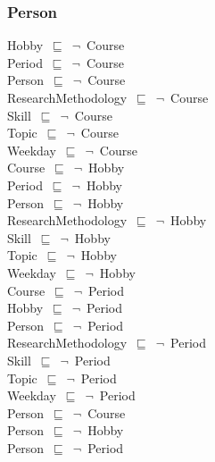 \documentclass{article}
\begin{document}
\subsubsection*{Person}

Hobby~\ensuremath{\sqsubseteq}~\ensuremath{\lnot}~Course\\
Period~\ensuremath{\sqsubseteq}~\ensuremath{\lnot}~Course\\
Person~\ensuremath{\sqsubseteq}~\ensuremath{\lnot}~Course\\
ResearchMethodology~\ensuremath{\sqsubseteq}~\ensuremath{\lnot}~Course\\
Skill~\ensuremath{\sqsubseteq}~\ensuremath{\lnot}~Course\\
Topic~\ensuremath{\sqsubseteq}~\ensuremath{\lnot}~Course\\
Weekday~\ensuremath{\sqsubseteq}~\ensuremath{\lnot}~Course\\
Course~\ensuremath{\sqsubseteq}~\ensuremath{\lnot}~Hobby\\
Period~\ensuremath{\sqsubseteq}~\ensuremath{\lnot}~Hobby\\
Person~\ensuremath{\sqsubseteq}~\ensuremath{\lnot}~Hobby\\
ResearchMethodology~\ensuremath{\sqsubseteq}~\ensuremath{\lnot}~Hobby\\
Skill~\ensuremath{\sqsubseteq}~\ensuremath{\lnot}~Hobby\\
Topic~\ensuremath{\sqsubseteq}~\ensuremath{\lnot}~Hobby\\
Weekday~\ensuremath{\sqsubseteq}~\ensuremath{\lnot}~Hobby\\
Course~\ensuremath{\sqsubseteq}~\ensuremath{\lnot}~Period\\
Hobby~\ensuremath{\sqsubseteq}~\ensuremath{\lnot}~Period\\
Person~\ensuremath{\sqsubseteq}~\ensuremath{\lnot}~Period\\
ResearchMethodology~\ensuremath{\sqsubseteq}~\ensuremath{\lnot}~Period\\
Skill~\ensuremath{\sqsubseteq}~\ensuremath{\lnot}~Period\\
Topic~\ensuremath{\sqsubseteq}~\ensuremath{\lnot}~Period\\
Weekday~\ensuremath{\sqsubseteq}~\ensuremath{\lnot}~Period\\
Person~\ensuremath{\sqsubseteq}~\ensuremath{\lnot}~Course\\
Person~\ensuremath{\sqsubseteq}~\ensuremath{\lnot}~Hobby\\
Person~\ensuremath{\sqsubseteq}~\ensuremath{\lnot}~Period\\
\end{document}

